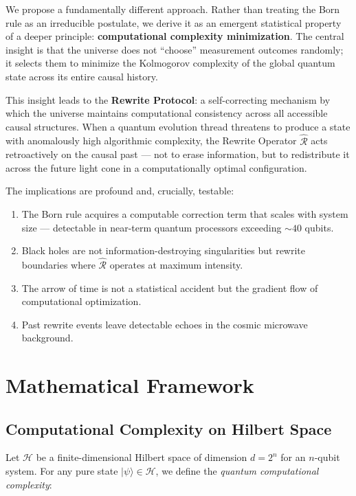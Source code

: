 \documentclass[12pt,a4paper]{article}
\newcommand{\ket}[1]{|#1\rangle}
\begin{document}
We propose a fundamentally different approach. Rather than treating the Born rule as an irreducible postulate, we derive it as an emergent statistical property of a deeper principle: \textbf{computational complexity minimization}. The central insight is that the universe does not ``choose'' measurement outcomes randomly; it selects them to minimize the Kolmogorov complexity of the global quantum state across its entire causal history.

This insight leads to the \textbf{Rewrite Protocol}: a self-correcting mechanism by which the universe maintains computational consistency across all accessible causal structures. When a quantum evolution thread threatens to produce a state with anomalously high algorithmic complexity, the Rewrite Operator $\hat{\mathcal{R}}$ acts retroactively on the causal past — not to erase information, but to redistribute it across the future light cone in a computationally optimal configuration.

The implications are profound and, crucially, testable:
\begin{enumerate}
    \item The Born rule acquires a computable correction term that scales with system size — detectable in near-term quantum processors exceeding $\sim 40$ qubits.
    \item Black holes are not information-destroying singularities but rewrite boundaries where $\hat{\mathcal{R}}$ operates at maximum intensity.
    \item The arrow of time is not a statistical accident but the gradient flow of computational optimization.
    \item Past rewrite events leave detectable echoes in the cosmic microwave background.
\end{enumerate}

\section{Mathematical Framework}

\subsection{Computational Complexity on Hilbert Space}

Let $\mathcal{H}$ be a finite-dimensional Hilbert space of dimension $d = 2^n$ for an $n$-qubit system. For any pure state $\ket{\psi} \in \mathcal{H}$, we define the \textit{quantum computational complexity}:
\end{document}
